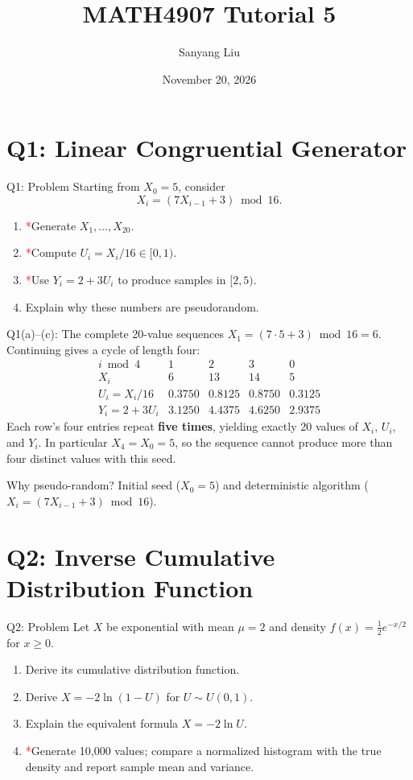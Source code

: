 \documentclass{beamer}
\title[MATH4907 Tutorial 5]{MATH4907 Tutorial 5}
\author{Sanyang Liu}
\date{November 20, 2026}
\newcommand{\keytext}[1]{\textcolor{lecturekey}{\textbf{#1}}}
\newcommand{\redstar}{\textcolor{red}{*}}
\begin{document}
\maketitle

\section[Q1]{Q1: Linear Congruential Generator}

\begin{frame}{Q1: Problem}
\small
Starting from $X_0=5$, consider
\[
X_i=(7X_{i-1}+3)\bmod16.
\]
\begin{enumerate}
\item[(a)] \redstar Generate $X_1,\ldots,X_{20}$.
\item[(b)] \redstar Compute $U_i=X_i/16\in[0,1)$.
\item[(c)] \redstar Use $Y_i=2+3U_i$ to produce samples in $[2,5)$.
\item[(d)] Explain why these numbers are pseudorandom.
\end{enumerate}
\end{frame}

\begin{frame}{Q1(a)--(c): The complete 20-value sequences}
\small
$X_1=(7\cdot5+3)\bmod16=6$. Continuing gives a cycle of length four:
\[
\begin{array}{c|rrrr}
i\bmod4&1&2&3&0\\\hline
X_i&6&13&14&5\\
U_i=X_i/16&0.3750&0.8125&0.8750&0.3125\\
Y_i=2+3U_i&3.1250&4.4375&4.6250&2.9375
\end{array}
\]
Each row's four entries repeat \keytext{five times}, yielding exactly 20
values of $X_i$, $U_i$, and $Y_i$. In particular $X_4=X_0=5$, so the
sequence cannot produce more than four distinct values with this seed.
\begin{block}{Why pseudo-random?}
Initial seed ($X_0=5$) and deterministic algorithm ($X_i=(7X_{i-1}+3)\bmod16$).
\end{block}
\end{frame}

\section[Q2]{Q2: Inverse Cumulative Distribution Function}

\begin{frame}{Q2: Problem}
\small
Let $X$ be exponential with mean $\mu=2$ and density
$f(x)=\tfrac12e^{-x/2}$ for $x\geq0$.
\begin{enumerate}
\item[(a)] Derive its cumulative distribution function.
\item[(b)] Derive $X=-2\ln(1-U)$ for $U\sim U(0,1)$.
\item[(c)] Explain the equivalent formula $X=-2\ln U$.
\item[(d)] \redstar Generate 10,000 values; compare a normalized histogram with the
true density and report sample mean and variance.
\end{enumerate}
\end{frame}
\end{document}
